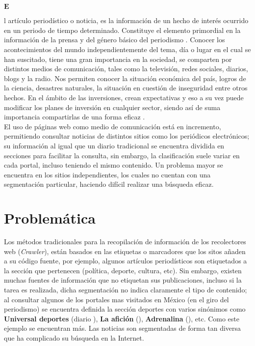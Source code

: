   








\ \\\\
\begin{Large}$\mathbf{E}$\end{Large}l artículo periodístico o noticia, es la información de un hecho de interés 
  ocurrido en un periodo de tiempo determinado. Constituye el elemento primordial en la información de la prensa y 
  del género básico del periodismo \citep{CU1}. Conocer los acontecimientos del mundo independientemente del tema, día o 
  lugar en el cual se han suscitado, tiene una gran importancia en la sociedad, se comparten por distintos medios de comunicación, 
  tales como la televisión, redes sociales, diarios, blogs y la radio. Nos permiten conocer la situación económica del país, logros 
  de la ciencia, desastres naturales, la situación en cuestión de inseguridad entre otros hechos. En el ámbito de las inversiones, 
  crean expectativas y eso a su vez puede modificar los planes de inversión en cualquier sector, siendo así de suma importancia 
  compartirlas de una forma eficaz \citep{CU2}.\\

El uso de páginas web como medio de comunicación está en incremento, permitiendo consultar noticias de distintos sitios como 
los periódicos electrónicos; su información al igual que un diario tradicional se encuentra dividida en secciones para facilitar 
la consulta, sin embargo, la clasificación suele variar en cada portal, incluso teniendo el mismo contenido. Un problema mayor se 
encuentra en los sitios independientes, los cuales no cuentan con una segmentación particular, haciendo difícil realizar una búsqueda eficaz.\\


\section{Problemática}


Los métodos tradicionales para la recopilación de información de los recolectores web (\textit{Crawler}), están basados en las etiquetas o 
marcadores que los sitos añaden a su código fuente, por ejemplo, algunos artículos periodísticos son etiquetados a la sección que pertenecen 
(política, deporte, cultura, etc). Sin embargo, existen muchas fuentes de información que no etiquetan sus publicaciones, incluso si la tarea 
es realizada, dicha segmentación no indica claramente el tipo de contenido; al consultar algunos de los portales mas visitados en México (en el giro del periodismo) 
se encuentra definida la sección deportes con varios sinónimos como \textbf{Universal deportes} (diario ), \textbf{La afición} 
(), \textbf{Adrenalina} (), etc. Como este ejemplo se encuentran más. Las noticias son segmentadas de forma tan diversa que 
ha complicado su búsqueda en la Internet.\\


